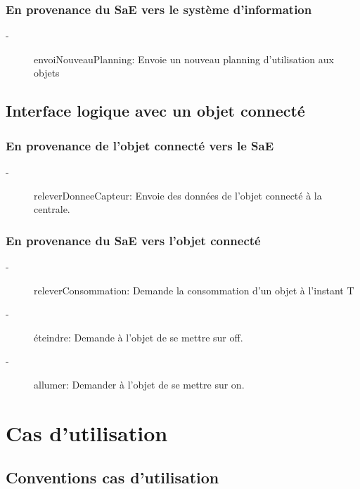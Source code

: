 \documentclass[10pt,a4paper]{report}
\begin{document}
			\subsection{En provenance du SaE vers le système d'information}
			
\begin{description}
	\item[-] envoiNouveauPlanning: Envoie un nouveau planning d'utilisation aux objets
\end{description}
			
			
		\section{Interface logique avec un objet connecté}
			\subsection{En provenance de l'objet connecté vers le SaE}
			
\begin{description}
	\item[-] releverDonneeCapteur: Envoie des données de l'objet connecté à la centrale.
\end{description}
			
			\subsection{En provenance du SaE vers l'objet connecté}
			
\begin{description}
	\item[-] releverConsommation: Demande la consommation d'un objet à l'instant T
	\item[-] éteindre: Demande à l'objet de se mettre sur off.
	\item[-] allumer: Demander à l'objet de se mettre sur on.
\end{description}


	\chapter{Cas d'utilisation}
		\section{Conventions cas d'utilisation}
\end{document}
